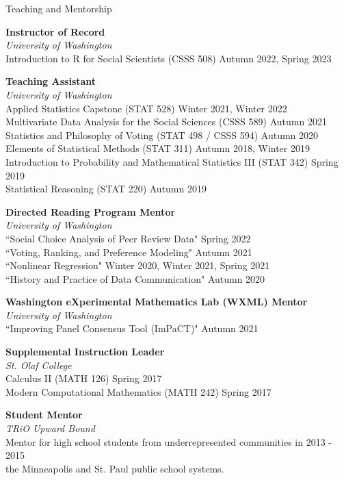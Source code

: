 \documentclass{resume} %
\begin{document}
\begin{rSection}{Teaching and Mentorship}

{\bf Instructor of Record}
\\ {\it University of Washington}
\\ Introduction to R for Social Scientists (CSSS 508) \hfill {Autumn 2022, Spring 2023}

{\bf Teaching Assistant}
\\ {\it University of Washington}
\\ Applied Statistics Capstone (STAT 528) \hfill Winter 2021, Winter 2022
\\ Multivariate Data Analysis for the Social Sciences (CSSS 589) \hfill Autumn 2021
\\ Statistics and Philosophy of Voting (STAT 498 / CSSS 594) \hfill Autumn 2020
\\ Elements of Statistical Methods (STAT 311) \hfill {Autumn 2018, Winter 2019}
\\ Introduction to Probability and Mathematical Statistics III (STAT 342) \hfill {Spring 2019}
\\ Statistical Reasoning (STAT 220) \hfill {Autumn 2019}

{\bf Directed Reading Program Mentor}
\\ {\it University of Washington}
\\ ``Social Choice Analysis of Peer Review Data" \hfill {Spring 2022}
\\ ``Voting, Ranking, and Preference Modeling" \hfill {Autumn 2021}
\\ ``Nonlinear Regression" \hfill {Winter 2020, Winter 2021, Spring 2021}
\\ ``History and Practice of Data Communication" \hfill Autumn 2020

{\bf Washington eXperimental Mathematics Lab (WXML) Mentor}
\\ {\it University of Washington}
\\ ``Improving Panel Consensus Tool (ImPaCT)" \hfill {Autumn 2021}


{\bf Supplemental Instruction Leader}
\\ {\it St. Olaf College}
\\ Calculus II (MATH 126) \hfill {Spring 2017}
\\ Modern Computational Mathematics (MATH 242) \hfill {Spring 2017}

{\bf Student Mentor} 
\\ {\it TRiO Upward Bound}
\\ Mentor for high school students from underrepresented communities in \hfill {2013 - 2015}
\\the Minneapolis and St. Paul public school systems.

\end{rSection}
\end{document}
